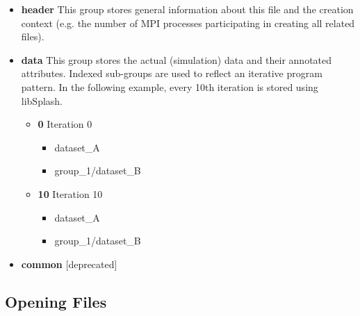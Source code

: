 \documentclass[a4paper,10pt,BCOR12mm]{report}
\begin{document}
\begin{itemize}
	\item \textbf{header}
	This group stores general information about this file and the creation context (e.g.
	the number of MPI processes participating in creating all related files).

	\item \textbf{data}
	This group stores the actual (simulation) data and their annotated attributes. Indexed
	sub-groups are used to reflect an iterative program pattern. In the following example, every 10th
	iteration is stored using libSplash.
	\begin{itemize}
		\item \textbf{0}
		Iteration 0
		\begin{itemize}
			\item dataset\_A
			\item group\_1/dataset\_B
		\end{itemize}

		\item \textbf{10}
		Iteration 10
		\begin{itemize}
			\item dataset\_A
			\item group\_1/dataset\_B
		\end{itemize}
	\end{itemize}

	\item \textbf{common} [deprecated]
\end{itemize}


\subsection{Opening Files}
\end{document}
